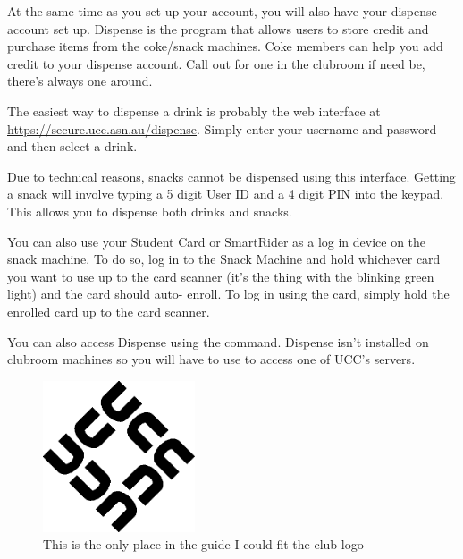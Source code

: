 

At the same time as you set up your account, you will also have your dispense account set up. Dispense is the program that allows users to store credit and purchase items from the coke/snack machines. Coke members can help you add credit to your dispense account. Call out for one in the clubroom if need be, there's always one around.


The easiest way to dispense a drink is probably the web interface at \url{https://secure.ucc.asn.au/dispense}. Simply enter your username and password and then select a drink. 

Due to technical reasons, snacks cannot be dispensed using this interface. Getting a snack will involve typing a 5 digit User ID and a 4 digit PIN into the keypad. This allows you to dispense both drinks and snacks.

You can also use your Student Card or SmartRider as a log in device on the snack machine. To do so, log in to the Snack Machine and hold whichever card you want to use up to the card scanner (it's the thing with the blinking green light) and the card should auto- enroll. To log in using the card, simply hold the enrolled card up to the card scanner.


You can also access Dispense using the  command. Dispense isn't installed on clubroom machines so you will have to use  to access one of UCC's servers.


\begin{figure}[H]
	\centering
	\includegraphics[width=0.4\textwidth]{figures/ucc-logo.png}
	\caption*{\tiny{This is the only place in the guide I could fit the club logo}} 
	\label{ucc-logo.png}
\end{figure}


